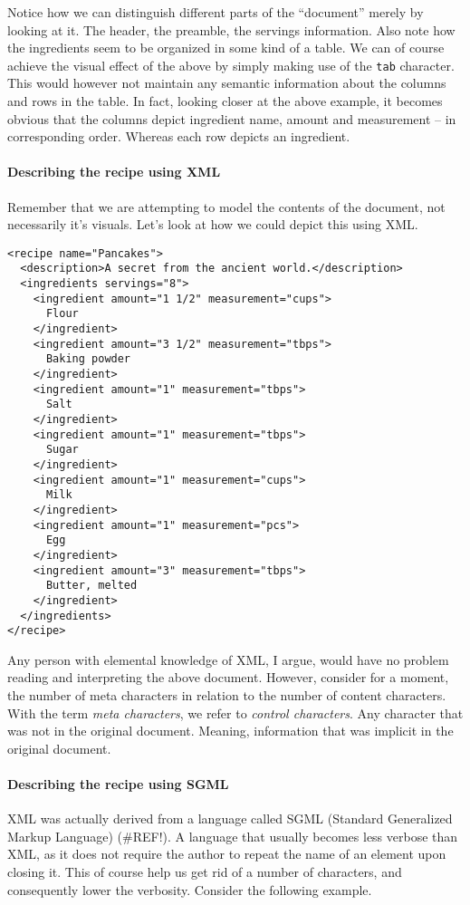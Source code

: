 \documentclass{scrreprt}
\begin{document}
Notice how we can distinguish different parts of the ``document'' merely by looking at it. The header, the preamble, the servings information. Also note how the ingredients seem to be organized in some kind of a table. We can of course achieve the visual effect of the above by simply making use of the \texttt{tab} character. This would however not maintain any semantic information about the columns and rows in the table. In fact, looking closer at the above example, it becomes obvious that the columns depict ingredient name, amount and measurement -- in corresponding order. Whereas each row depicts an ingredient. 

\paragraph{Describing the recipe using XML}
Remember that we are attempting to model the contents of the document, not necessarily it's visuals. Let's look at how we could depict this using XML.
\begin{lstlisting}
<recipe name="Pancakes">
  <description>A secret from the ancient world.</description>
  <ingredients servings="8">
    <ingredient amount="1 1/2" measurement="cups">
      Flour
    </ingredient>
    <ingredient amount="3 1/2" measurement="tbps">
      Baking powder
    </ingredient>
    <ingredient amount="1" measurement="tbps">
      Salt
    </ingredient>
    <ingredient amount="1" measurement="tbps">
      Sugar
    </ingredient>
    <ingredient amount="1" measurement="cups">
      Milk
    </ingredient>
    <ingredient amount="1" measurement="pcs">
      Egg
    </ingredient>
    <ingredient amount="3" measurement="tbps">
      Butter, melted
    </ingredient>
  </ingredients>
</recipe>
\end{lstlisting}
Any person with elemental knowledge of XML, I argue, would have no problem reading and interpreting the above document. However, consider for a moment, the number of meta characters in relation to the number of content characters. With the term \emph{meta characters}, we refer to \emph{control characters}. Any character that was not in the original document. Meaning, information that was implicit in the original document.

\paragraph{Describing the recipe using SGML}
XML was actually derived from a language called SGML (Standard Generalized Markup Language) (\#REF!). A language that usually becomes less verbose than XML, as it does not require the author to repeat the name of an element upon closing it. This of course help us get rid of a number of characters, and consequently lower the verbosity. Consider the following example.
\end{document}
